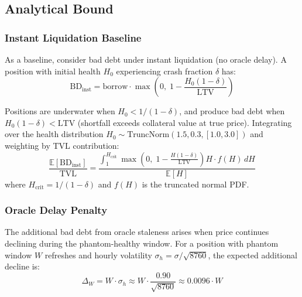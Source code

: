 \documentclass[10pt,a4paper,twocolumn]{article}
\begin{document}
\subsection{Analytical Bound}
\label{sec:bd-bound}

\subsubsection{Instant Liquidation Baseline}
\label{subsec:bd-instant}

As a baseline, consider bad debt under instant liquidation (no oracle delay). A position with initial health $H_0$ experiencing crash fraction $\delta$ has:
\begin{equation}
\text{BD}_{\text{inst}} = \text{borrow} \cdot \max\!\left(0,\; 1 - \frac{H_0(1{-}\delta)}{\text{LTV}}\right)
\end{equation}

Positions are underwater when $H_0 < 1/(1{-}\delta)$, and produce bad debt when $H_0(1{-}\delta) < \text{LTV}$ (shortfall exceeds collateral value at true price). Integrating over the health distribution $H_0 \sim \text{TruncNorm}(1.5, 0.3, [1.0, 3.0])$ and weighting by TVL contribution:
\begin{equation}
\label{eq:bd-instant}
\frac{\mathbb{E}[\text{BD}_{\text{inst}}]}{\text{TVL}} = \frac{\int_{1}^{H_{\text{crit}}} \max\!\left(0,\; 1 - \frac{H(1{-}\delta)}{\text{LTV}}\right) H \cdot f(H)\,dH}{\mathbb{E}[H]}
\end{equation}
where $H_{\text{crit}} = 1/(1{-}\delta)$ and $f(H)$ is the truncated normal PDF.

\subsubsection{Oracle Delay Penalty}
\label{subsec:bd-delay}

The additional bad debt from oracle staleness arises when price continues declining during the phantom-healthy window. For a position with phantom window $W$ refreshes and hourly volatility $\sigma_h = \sigma/\sqrt{8760}$, the expected additional decline is:
\begin{equation}
\label{eq:additional-decline}
\Delta_W = W \cdot \sigma_h \approx W \cdot \frac{0.90}{\sqrt{8760}} \approx 0.0096 \cdot W
\end{equation}
\end{document}
